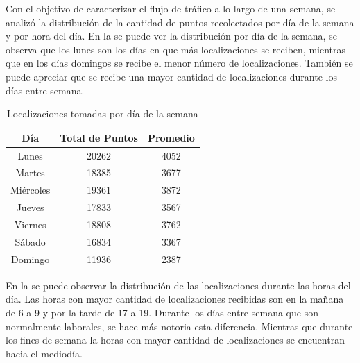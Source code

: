 Con el objetivo de caracterizar el flujo de tráfico a lo largo de una semana, se analizó la distribución de la cantidad de puntos recolectados por día de la semana y por hora del día. En la  se puede ver la distribución por día de la semana, se observa que los lunes son los días en que más localizaciones se reciben, mientras que en los días domingos se recibe el menor número de localizaciones. También se puede apreciar que se recibe una mayor cantidad de localizaciones durante los días entre semana.

\begin{table}[h]
	\centering
	\begin{tabular}{ccc}
        \toprule
    	Día  & Total de Puntos & Promedio\\
    	\midrule
    	Lunes & 20262 & 4052 \\
    	Martes & 18385 & 3677 \\
    	Miércoles & 19361  & 3872 \\ 
    	Jueves & 17833 & 3567 \\
    	Viernes & 18808 & 3762 \\
    	Sábado & 16834 & 3367 \\
    	Domingo & 11936 & 2387 \\
    	\bottomrule
	\end{tabular}
	\caption{Localizaciones tomadas por día de la semana} 
	\label{table:localizaciones_por_dia}
\end{table}

En la  se puede observar la distribución de las localizaciones durante las horas del día. Las horas con mayor cantidad de localizaciones recibidas son en la mañana de 6 a 9 y por la tarde de 17 a 19. Durante los días entre semana que son normalmente laborales, se hace más notoria esta diferencia. Mientras que durante los fines de semana la horas con mayor cantidad de localizaciones se encuentran hacia el mediodía.

